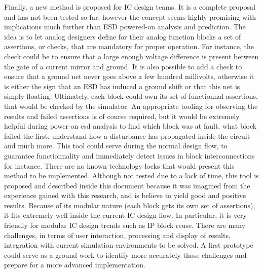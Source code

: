 Finally, a new method is proposed for IC design teams.
It is a complete proposal and has not been tested so far, however the concept seems highly promising with implications much further than ESD powered-on analysis and prediction.
The idea is to let analog designers define for their analog function blocks a set of assertions, or checks, that are mandatory for proper operation.
For instance, the check could be to ensure that a large enough voltage difference is present between the gate of a current mirror and ground.
It is also possible to add a check to ensure that a ground net never goes above a few hundred millivolts, otherwise it is either the sign that an ESD has induced a ground shift or that this net is simply floating.
Ultimately, each block could own its set of functionnal assertions, that would be checked by the simulator.
An appropriate tooling for observing the results and failed assertions is of course required, but it would be extremely helpful during power-on esd analysis to find which block was at fault, what block failed the first, understand how a disturbance has propagated inside the circuit and much more.
This tool could serve during the normal design flow, to guarantee functionnality and immediately detect issues in block interconnections for instance.
There are no known technology locks that would present this method to be implemented.
Although not tested due to a lack of time, this tool is proposed and described inside this document because it was imagined from the experience gained with this research, and is believe to yield good and positive results.
Because of its modular nature (each block gets its own set of assertions), it fits extremely well inside the current IC design flow.
In particular, it is very friendly for modular IC design trends such as IP block reuse.
There are many challenges, in terms of user interaction, processing and display of results, integration with current simulation environments to be solved.
A first prototype could serve as a ground work to identify more accurately those challenges and prepare for a more advanced implementation.

